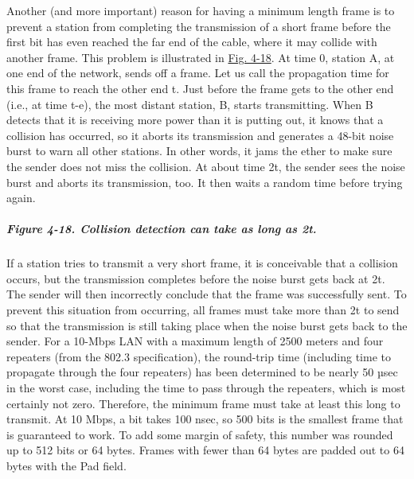 \documentclass[b5paper,11pt]{memoir}
\begin{document}
Another (and more important) reason for having a minimum length frame is
to prevent a station from completing the transmission of a short frame
before the first bit has even reached the far end of the cable, where it
may collide with another frame. This problem is illustrated in
\protect\hyperlink{0130661023_ch04lev1sec3.htmlux5cux23ch04fig18}{Fig.
4-18}. At time 0, station {A}, at one end of the network, sends off a
frame. Let us call the propagation time for this frame to reach the
other end {t}. Just before the frame gets to the other end (i.e., at
time {t}-{e}), the most distant station, {B}, starts transmitting. When
{B} detects that it is receiving more power than it is putting out, it
knows that a collision has occurred, so it aborts its transmission and
generates a 48-bit noise burst to warn all other stations. In other
words, it jams the ether to make sure the sender does not miss the
collision. At about time 2{t}, the sender sees the noise burst and
aborts its transmission, too. It then waits a random time before trying
again.

\subparagraph[Figure 4-18. Collision detection can take as long as
2{t}.]{\texorpdfstring{\protect\hypertarget{0130661023_ch04lev1sec3.htmlux5cux23ch04fig18}{}{}Figure
4-18. Collision detection can take as long as
2{t}.}{Figure 4-18. Collision detection can take as long as 2t.}}


If a station tries to transmit a very short frame, it is conceivable
that a collision occurs, but the transmission completes before the noise
burst gets back at 2{t}. The sender will then incorrectly conclude that
the frame was successfully sent. To prevent this situation from
occurring, all frames must take more than 2{t} to send so that the
transmission is still taking place when the noise burst gets back to the
sender. For a 10-Mbps LAN with a maximum length of 2500 meters and four
repeaters (from the 802.3 specification), the round-trip time (including
time to propagate through the four repeaters) has been determined to be
nearly 50 µsec in the worst case, including the time to pass through the
repeaters, which is most certainly not zero. Therefore, the minimum
frame must take at least this long to transmit. At 10 Mbps, a bit takes
100 nsec, so 500 bits is the smallest frame that is guaranteed to work.
To add some margin of safety, this number was rounded up to 512 bits or
64 bytes. Frames with fewer than 64 bytes are padded out to 64 bytes
with the {Pad} field.
\end{document}
